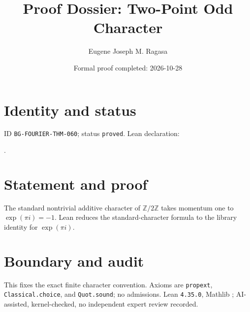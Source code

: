 \documentclass[11pt]{article}
\title{Proof Dossier: Two-Point Odd Character}\author{Eugene Joseph M. Ragasa}\date{Formal proof completed: 2026-10-28}
\begin{document}
\raggedright\maketitle
\section{Identity and status}
ID \texttt{BG-FOURIER-THM-060}; status \texttt{proved}. Lean declaration:
\par{}.
\section{Statement and proof}
The standard nontrivial additive character of $\mathbb Z/2\mathbb Z$ takes momentum one to $\exp(\pi i)=-1$. Lean reduces the standard-character formula to the library identity for $\exp(\pi i)$.
\section{Boundary and audit}
This fixes the exact finite character convention. Axioms are \texttt{propext}, \texttt{Classical.choice}, and \texttt{Quot.sound}; no admissions. Lean \texttt{4.35.0}, Mathlib {\scriptsize{}}; AI-assisted, kernel-checked, no independent expert review recorded.
\end{document}

